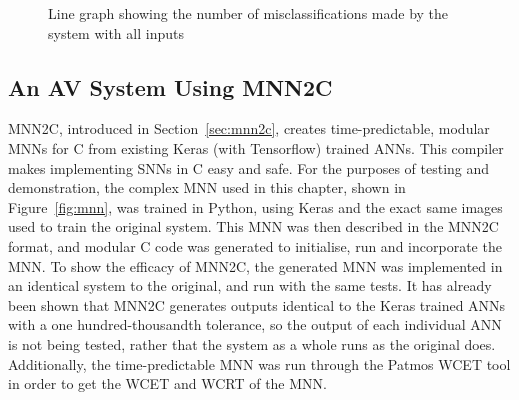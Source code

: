 \begin{figure}[t]
	\centering
	\scalebox{1}{}
	\caption{Line graph showing the number of misclassifications made by the system with all inputs \label{fig:sign-graphboth}}
\end{figure}


\subsection{An \ac{AV} System Using \acf{MNN2C}}
\ac{MNN2C}, introduced in Section~\ref{sec:mnn2c}, creates time-predictable, modular \acfp{MNN} for C from existing Keras (with Tensorflow) trained \acp{ANN}. 
This compiler makes implementing \acfp{SNN} in C easy and safe.
For the purposes of testing and demonstration, the complex \ac{MNN} used in this chapter, shown in Figure~\ref{fig:mnn}, was trained in Python, using Keras and the exact same images used to train the original system.
This \ac{MNN} was then described in the \ac{MNN2C} format, and modular C code was generated to initialise, run and incorporate the \ac{MNN}.
To show the efficacy of \ac{MNN2C}, the generated \ac{MNN} was implemented in an identical system to the original, and run with the same tests. 
It has already been shown that \ac{MNN2C} generates outputs identical to the Keras trained \acp{ANN} with a one hundred-thousandth tolerance, so the output of each individual \ac{ANN} is not being tested, rather that the system as a whole runs as the original does.
Additionally, the time-predictable \ac{MNN} was run through the Patmos \ac{WCET} tool in order to get the \ac{WCET} and \ac{WCRT} of the \ac{MNN}.

